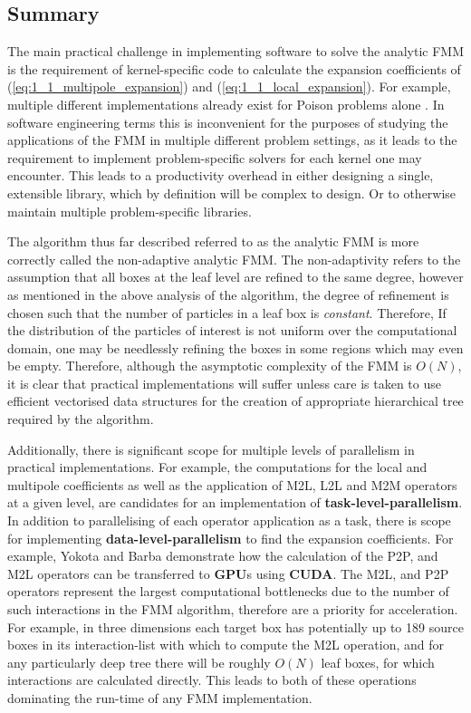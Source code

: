 \subsection{Summary}

The main practical challenge in implementing software to solve the analytic FMM
is the requirement of kernel-specific code to calculate the expansion coefficients of
(\ref{eq:1_1_multipole_expansion}) and (\ref{eq:1_1_local_expansion}). For example,
multiple different implementations already exist for Poison problems alone \cite{Greengard:1996:JCP, Etheridge:2001:SIAM}.
In software engineering terms this is inconvenient for the purposes of studying
the applications of the FMM in multiple different problem settings, as it leads to the requirement
to implement problem-specific solvers for each kernel one may encounter. This
leads to a productivity overhead in either designing a single, extensible
library, which by definition will be complex to design. Or to otherwise
maintain multiple problem-specific libraries.

The algorithm thus far described referred to as the analytic FMM is more correctly
called the non-adaptive analytic FMM. The non-adaptivity refers to the assumption that
all boxes at the leaf level are refined to the same degree, however as mentioned
in the above analysis of the algorithm, the degree of refinement is chosen such
that the number of particles in a leaf box is \textit{constant}. Therefore, If
the distribution of the particles of interest is not uniform over the computational
domain, one may be needlessly refining the boxes in some regions which may even be
empty. Therefore, although the asymptotic complexity of
the FMM is $O(N)$, it is clear that practical implementations will suffer unless
care is taken to use efficient vectorised data structures for the creation of
appropriate hierarchical tree required by the algorithm.

Additionally, there is significant scope for multiple levels of
parallelism in practical implementations. For example, the computations
for the local and multipole coefficients as well as the application of M2L, L2L
and M2M operators at a given level, are candidates for an implementation of
\textbf{\gls{task-level-parallelism}}. In addition to parallelising of each operator
application as a task, there is scope for implementing
\textbf{\gls{data-level-parallelism}} to find the expansion coefficients. For example,
Yokota and Barba \cite{Hwu:2011:MKP} demonstrate how the calculation of the P2P,
and M2L operators can be transferred to \textbf{\gls{GPU}}s using \textbf{\gls{CUDA}}.
The M2L, and P2P operators represent the largest computational bottlenecks due to
the number of such interactions in the FMM algorithm, therefore are a priority for
acceleration. For example, in three dimensions each target box has potentially
up to 189 source boxes in its \gls{interaction-list} with which to compute the
M2L operation, and for any particularly deep tree there will be roughly $O(N)$
leaf boxes, for which interactions are calculated directly. This leads to both of
these operations dominating the run-time of any \gls{FMM} implementation.

